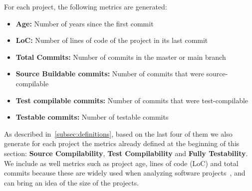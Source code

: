 
For each project, the following metrics are generated:

\begin{itemize}
    \item \textbf{Age:} Number of years since the first commit
    \item \textbf{LoC:} Number of lines of code of the project in its last commit
    \item \textbf{Total Commits:} Number of commits in the master or main branch
    \item \textbf{Source Buildable commits:} Number of commits that were source-compilable
    \item \textbf{Test compilable commits:} Number of commits that were test-compilable
    \item \textbf{Testable commits:} Number of testable commits
\end{itemize}


As described in~\ref{subsec:definitions}, based on the last four of them we also generate for each project the metrics already defined at the beginning of this section: \textbf{Source Compilability}, \textbf{Test Compilability} and \textbf{Fully Testability}.
We include as well metrics such as project age, lines of code (LoC) and total commits because these are widely used when analyzing software projects~\cite{yamashita2015revisiting,mannan2016understanding,rosen2015commit}, and can bring an idea of the size of the projects. 

